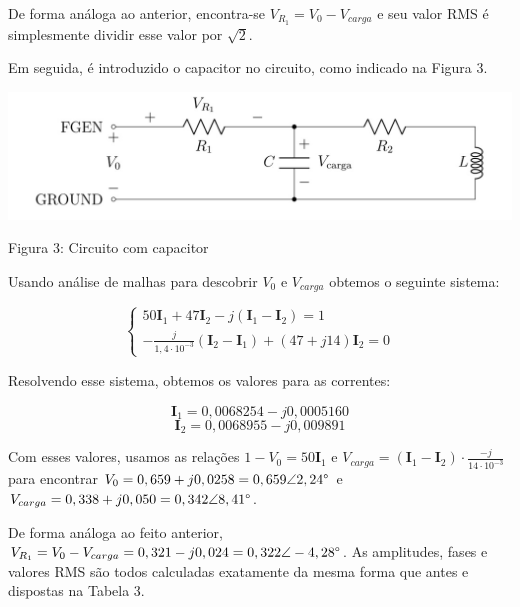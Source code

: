 \documentclass[a4 paper]{article}
\begin{document}
De forma análoga ao anterior, encontra-se $V_{R_1}=V_0-V_{carga}$ e seu valor RMS é simplesmente dividir esse valor por $\sqrt{2}$.

\vspace{1cm}


\vspace{1cm}
Em seguida, é introduzido o capacitor no circuito, como indicado na Figura 3. 

\vspace{3cm}
\begin{table}[h]
\centering
\includegraphics[scale=0.5]{figuras/figura2}
\end{table}

\begin{center}
Figura 3: Circuito com capacitor 
\end{center}

Usando análise de malhas para descobrir $V_0$ e $V_{carga}$ obtemos o seguinte sistema:

\begin{equation*}
\left\{
\begin{aligned}
50\textbf{I}_1+47\textbf{I}_2-j(\textbf{I}_1-\textbf{I}_2)=1\\
-\frac{j}{1,4\cdot10^{-3}}(\textbf{I}_2-\textbf{I}_1)+(47+j14)\textbf{I}_2=0
\end{aligned}\right.
\end{equation*}

Resolvendo esse sistema, obtemos os valores para as correntes:

\[\textbf{I}_1=0,0068254-j0,0005160\]
\[\textbf{I}_2=0,0068955-j0,009891\]


Com esses valores, usamos as relações $1-V_0=50\textbf{I}_1$ e $V_{carga}=(\textbf{I}_1-\textbf{I}_2)\cdot\frac{-j}{14\cdot10^{-3}}$ para encontrar $V_0=0,659+j0,0258=0,659\angle2,24\text{\textdegree}$ e $V_{carga}=0,338+j0,050=0,342\angle8,41\text{\textdegree}$.

De forma análoga ao feito anterior, $V_{R_1}=V_0-V_{carga}=0,321-j0,024=0,322\angle-4,28\text{\textdegree}$. As amplitudes, fases e valores RMS são todos calculadas exatamente da mesma forma que antes e dispostas na Tabela 3.
\end{document}

